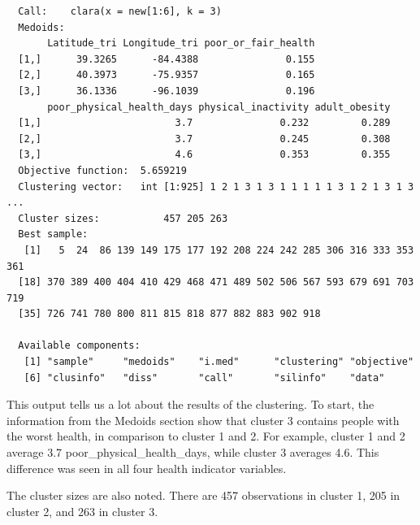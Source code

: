 \documentclass[12pt,twoside]{amherstthesis}
\begin{document}
  \begin{Shaded}
  \begin{Highlighting}[]
  \end{Highlighting}
  \end{Shaded}
  
  \begin{verbatim}
  Call:    clara(x = new[1:6], k = 3) 
  Medoids:
       Latitude_tri Longitude_tri poor_or_fair_health
  [1,]      39.3265      -84.4388               0.155
  [2,]      40.3973      -75.9357               0.165
  [3,]      36.1336      -96.1039               0.196
       poor_physical_health_days physical_inactivity adult_obesity
  [1,]                       3.7               0.232         0.289
  [2,]                       3.7               0.245         0.308
  [3,]                       4.6               0.353         0.355
  Objective function:  5.659219
  Clustering vector:   int [1:925] 1 2 1 3 1 3 1 1 1 1 1 3 1 2 1 3 1 3 ...
  Cluster sizes:           457 205 263 
  Best sample:
   [1]   5  24  86 139 149 175 177 192 208 224 242 285 306 316 333 353 361
  [18] 370 389 400 404 410 429 468 471 489 502 506 567 593 679 691 703 719
  [35] 726 741 780 800 811 815 818 877 882 883 902 918
  
  Available components:
   [1] "sample"     "medoids"    "i.med"      "clustering" "objective" 
   [6] "clusinfo"   "diss"       "call"       "silinfo"    "data"      
  \end{verbatim}
  
  This output tells us a lot about the results of the clustering. To
  start, the information from the Medoids section show that cluster 3
  contains people with the worst health, in comparison to cluster 1 and 2.
  For example, cluster 1 and 2 average 3.7 poor\_physical\_health\_days,
  while cluster 3 averages 4.6. This difference was seen in all four
  health indicator variables.
  
  The cluster sizes are also noted. There are 457 observations in cluster
  1, 205 in cluster 2, and 263 in cluster 3.
  
  \begin{Shaded}
  \begin{Highlighting}[]
  
  \OperatorTok{$}
  \end{Highlighting}
  \end{Shaded}
  
\end{document}
